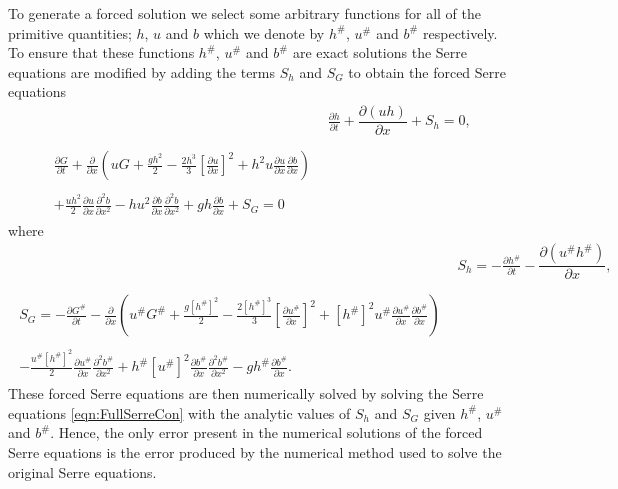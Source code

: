 \documentclass[times]{elsarticle}
\begin{document}
To generate a forced solution we select some arbitrary functions for all of the primitive quantities; $h$, $u$ and $b$ which we denote by $h^\#$, $u^\#$ and $b^\#$ respectively. To ensure that these functions $h^\#$, $u^\#$ and $b^\#$ are exact solutions the Serre equations are modified by adding the terms $S_{h} $ and $S_{G}$ to obtain the forced Serre equations
\begin{align*}
& \frac{\partial h}{\partial t} + \dfrac{\partial (uh)}{\partial x} + S_{h}  = 0 ,  \\ \nonumber \\
\begin{split}
\frac{\partial G}{\partial t}  + \frac{\partial}{\partial x} \left( {u} G + \frac{gh^2}{2} - \frac{2h^3}{3} \left[ \frac{\partial {u}}{\partial x} \right]^2 + h^2 {u}\frac{\partial {u}}{\partial x}\frac{\partial b}{\partial x} \right) \\ \\ + \frac{uh^2 }{2}\frac{\partial {u}}{\partial x} \frac{\partial^2 b}{\partial x^2}  - h {u}^2\frac{\partial b}{\partial x}\frac{\partial^2 b}{\partial x^2} + gh\frac{\partial b}{\partial x} + S_{G} = 0
\end{split}
\end{align*}
where
\begin{align*}
&  S_{h} = -\frac{\partial h^\#}{\partial t} - \dfrac{\partial (u^\#h^\#)}{\partial x} ,  \\ \nonumber \\
\begin{split}
S_{G} = -\frac{\partial G^\#}{\partial t}  - \frac{\partial}{\partial x} \left( {u}^\# G^\# + \frac{g\left[h^\#\right]^2}{2} - \frac{2\left[h^\#\right]^3}{3} \left[\frac{\partial {u}^\#}{\partial x}\right]^2 + \left[h^\#\right]^2 {u^\#}\frac{\partial {u}^\#}{\partial x}\frac{\partial b^\#}{\partial x} \right) \\ \\ - \frac{{u}^\#\left[h^\#\right]^2 }{2} \frac{\partial {u}^\#}{\partial x} \frac{\partial^2 b^\#}{\partial x^2}  + h^\# {\left[u^\#\right]}^2\frac{\partial b^\#}{\partial x}\frac{\partial^2 b^\#}{\partial x^2} - gh^\#\frac{\partial b^\#}{\partial x}.
\end{split}
\end{align*}
These forced Serre equations are then numerically solved by solving the Serre equations \eqref{eqn:FullSerreCon} with the analytic values of $S_{h}$ and $S_{G}$ given $h^\#$, $u^\#$ and $b^\#$. Hence, the only error present in the numerical solutions of the forced Serre equations is the error produced by the numerical method used to solve the original Serre equations.
\end{document}
